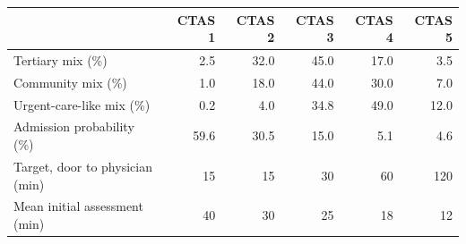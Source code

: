 \begin{tabular}{lrrrrr}
\toprule
 & CTAS 1 & CTAS 2 & CTAS 3 & CTAS 4 & CTAS 5 \\
\midrule
Tertiary mix (\%) & 2.5 & 32.0 & 45.0 & 17.0 & 3.5 \\
Community mix (\%) & 1.0 & 18.0 & 44.0 & 30.0 & 7.0 \\
Urgent-care-like mix (\%) & 0.2 & 4.0 & 34.8 & 49.0 & 12.0 \\
Admission probability (\%) & 59.6 & 30.5 & 15.0 & 5.1 & 4.6 \\
Target, door to physician (min) & 15 & 15 & 30 & 60 & 120 \\
Mean initial assessment (min) & 40 & 30 & 25 & 18 & 12 \\
\bottomrule
\end{tabular}